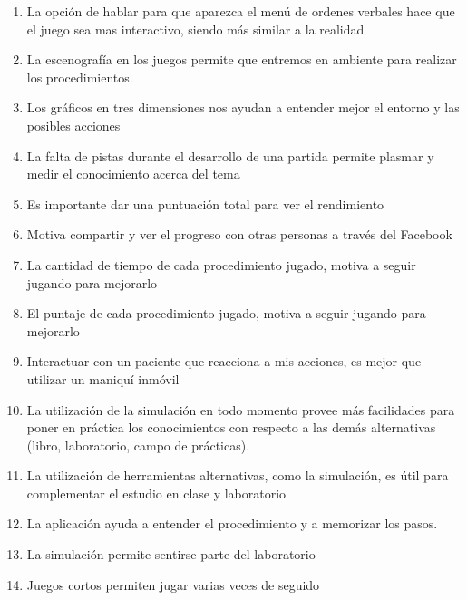 \begin{enumerate}[label=\bfseries SC\arabic*.:]
\item La opción de hablar para que aparezca el menú de ordenes verbales hace que el
juego sea mas interactivo, siendo más similar a la realidad

\item La escenografía en los juegos permite que entremos en ambiente para realizar
los procedimientos.

\item Los gráficos en tres dimensiones nos ayudan a entender mejor el entorno y las
posibles acciones

\item La falta de pistas durante el desarrollo de una partida permite plasmar y medir el
conocimiento acerca del tema

\item Es importante dar una puntuación total para ver el rendimiento

\item Motiva compartir y ver el progreso con otras personas a través del Facebook

\item La cantidad de tiempo de cada procedimiento jugado, motiva a seguir jugando
para mejorarlo

\item El puntaje de cada procedimiento jugado, motiva a seguir jugando para
mejorarlo

\item Interactuar con un paciente que reacciona a mis acciones, es mejor que utilizar
un maniquí inmóvil

\item La utilización de la simulación en todo momento provee más facilidades para
poner en práctica los conocimientos con respecto a las demás alternativas (libro,
laboratorio, campo de prácticas).

\item La utilización de herramientas alternativas, como la simulación, es útil para
complementar el estudio en clase y laboratorio

\item La aplicación ayuda a entender el procedimiento y a memorizar los pasos.

\item La simulación permite sentirse parte del laboratorio

\item Juegos cortos permiten jugar varias veces de seguido

\end{enumerate}

